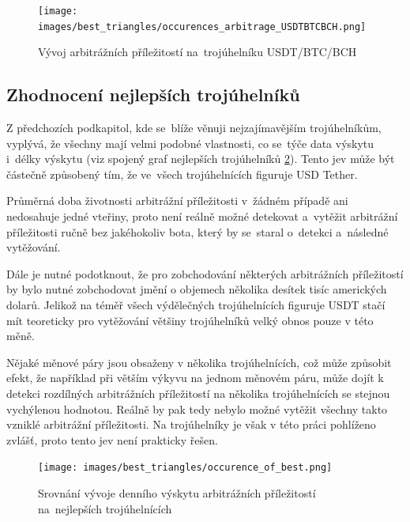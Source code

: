 \documentclass[thesis=B,czech]{FITthesis}[2019/03/21]
\begin{document}
\begin{figure}\centering
	\texttt{[image: images/best\_triangles/occurences\_arbitrage\_USDTBTCBCH.png]}
	\caption{Vývoj arbitrážních příležitostí na~trojúhelníku USDT/BTC/BCH }\label{occurences_arbitrage_USDTBTCBCH}
\end{figure}

\subsection{Zhodnocení nejlepších trojúhelníků}
Z předchozích podkapitol, kde se~blíže věnuji nejzajímavějším trojúhelníkům, vyplývá, že všechny mají velmi podobné vlastnosti, co se~týče data výskytu i~délky výskytu (viz spojený graf nejlepších trojúhelníků \ref{occurence_of_best}). Tento jev může být částečně způsobený tím, že ve~všech trojúhelnících figuruje USD Tether. 

Průměrná doba životnosti arbitrážní příležitosti v~žádném případě ani nedosahuje jedné vteřiny, proto není reálně možné detekovat a~vytěžit arbitrážní příležitosti ručně bez jakéhokoliv bota, který by se~staral o~detekci a~následné vytěžování. 

Dále je nutné podotknout, že pro zobchodování některých arbitrážních příležitostí by bylo nutné zobchodovat jmění o objemech několika desítek tisíc amerických dolarů. Jelikož na téměř všech výdělečných trojúhelnících figuruje USDT stačí mít teoreticky pro vytěžování většiny trojúhelníků velký obnos pouze v této měně.

Nějaké měnové páry jsou obsaženy v několika trojúhelnících, což může způsobit efekt, že například při větším výkyvu na jednom měnovém páru, může dojít k detekci rozdílných arbitrážních příležitostí na několika trojúhelnících se stejnou vychýlenou hodnotou. Reálně by pak tedy nebylo možné vytěžit všechny takto vzniklé arbitrážní příležitosti. Na trojúhelníky je však v této práci pohlíženo zvlášť, proto tento jev není prakticky řešen.

\begin{figure}\centering
	\texttt{[image: images/best\_triangles/occurence\_of\_best.png]}
	\caption{Srovnání vývoje denního výskytu arbitrážních příležitostí na~nejlepších trojúhelnících }\label{occurence_of_best}
\end{figure}
\end{document}
